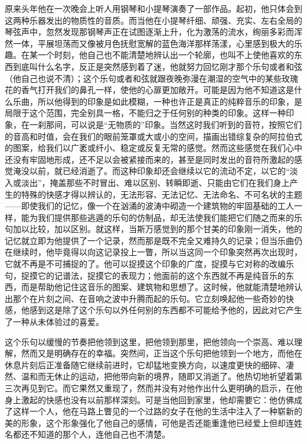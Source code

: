 \par 原来头年他在一次晚会上听人用钢琴和小提琴演奏了一部作品。起初，他只体会到这两种乐器发出的物质性的音质。而当他在小提琴纤细、顽强、充实、左右全局的琴弦声中，忽然发现那钢琴声正在试图逐渐上升，化为激荡的流水，绚丽多彩而浑然一体，平展坦荡而又像被月色抚慰宽解的蓝色海洋那样荡漾，心里感到极大的乐趣。在某一个时刻，他自己也不能清楚地辨认出一个轮廓，也叫不上使他喜欢的东西到底叫什么名字，反正是突然感到着了迷，他就努力回忆刚才那个乐句或者和弦（他自己也说不清）；这个乐句或者和弦就跟夜晚弥漫在潮湿的空气中的某些玫瑰花的香气打开我们的鼻孔一样，使他的心扉更加敞开。可能是因为他不知道这是什么乐曲，所以他得到的印象是如此模糊，一种也许正是真正的纯粹音乐的印象，是局限于这个范围，完全别具一格，不能归之于任何别的种类的印象。这样一种印象，在一刹那间，可以说是“无物质的”印象。当然这时我们听到的音符，按照它们的音高和时值，会在我们的眼前笼罩或大或小的空间，描画出错综复杂的阿拉伯式的图案，给我们以广袤或纤小、稳定或反复无常的感觉。然而这些感觉在我们心中还没有牢固地形成，还不足以会被紧接而来的，甚至是同时发出的音符所激起的感觉淹没以前，就已经消逝了。而这种印象却还会继续以它的流动不定，以它的“淡入或淡出”，掩盖那些不时冒出、难以区别、转瞬即逝、只能由它们在我们身上产生的特殊的快感才得以辨认的，无法形容、无法记忆、无法命名、不可名状的主题——即使我们的记忆，像一个在汹涌的波涛中砌造一个建筑物的牢固基础的工人一样，能为我们提供那些逃遁的乐句的仿制品，却无法使我们能把它们随之而来的乐句加以比较，加以区别。就这样，当斯万感觉到的那个甘美的印象刚一消失，他的记忆就立即为他提供了一个记录，然而那是既不完全又难持久的记录；但当乐曲仍在继续时，他毕竟得以向这记录投上一瞥，所以当这同一个印象突然再次出现时，它就不再是不可捕捉的了。他可以捉摸这个印象的广度，捉摸与它对称的改编乐句，捉摸它的记谱法，捉摸它的表现力；他面前的这个东西就不再是纯音乐的东西，而是帮助他记住这音乐的图案、建筑物和思想了。这时候，他就能清楚地辨认出那个在片刻之间、在音响之波中升腾而起的乐句。它立刻唤起他一些奇妙的快感，他感到这是除了这个乐句以外任何别的东西都不可能给予他的，因此对它产生了一种从未体验过的喜爱。
\par 这个乐句以缓慢的节奏把他领到这里，把他领到那里，把他领向一个崇高、难以理解，然而又是明确存在的幸福。突然间，正当这个乐句把他领到一个地方，而他在休息片刻后正准备随它继续前进时，它却猛地变换方向，以速度更快的细碎、凄然、温和而无休止的运动，把他带向新的境界，随即又消逝了。他热切地祈望着第三次再见到它。而它果然又重现了，然而并没有对他作出什么更明确的启示，在他身上激起的快感也没有以前那样深刻。可是当他回到家里，他却需要它：他仿佛成了这样一个人，他在马路上瞥见的一个过路的女子在他的生活中注入了一种崭新的美的形象，这个形象强化了他自己的感情，可他是否还能重逢他已经爱上但却连姓名都还不知道的那个人，连他自己也不清楚。
